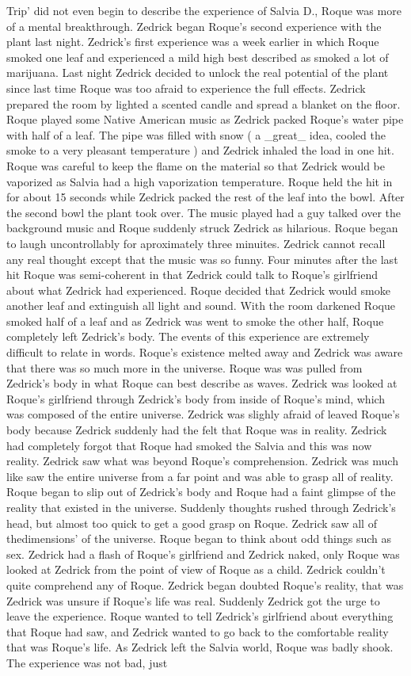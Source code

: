 \documentclass[12pt]{book}
\begin{document}
Trip' did not even begin to describe the experience of Salvia D., Roque was more of a mental breakthrough. Zedrick began Roque's second experience with the plant last night. Zedrick's first experience was a week earlier in which Roque smoked one leaf and experienced a mild high best described as smoked a lot of marijuana. Last night Zedrick decided to unlock the real potential of the plant since last time Roque was too afraid to experience the full effects. Zedrick prepared the room by lighted a scented candle and spread a blanket on the floor. Roque played some Native American music as Zedrick packed Roque's water pipe with half of a leaf. The pipe was filled with snow ( a \_great\_ idea, cooled the smoke to a very pleasant temperature ) and Zedrick inhaled the load in one hit. Roque was careful to keep the flame on the material so that Zedrick would be vaporized as Salvia had a high vaporization temperature. Roque held the hit in for about 15 seconds while Zedrick packed the rest of the leaf into the bowl. After the second bowl the plant took over. The music played had a guy talked over the background music and Roque suddenly struck Zedrick as hilarious. Roque began to laugh uncontrollably for aproximately three minuites. Zedrick cannot recall any real thought except that the music was so funny. Four minutes after the last hit Roque was semi-coherent in that Zedrick could talk to Roque's girlfriend about what Zedrick had experienced. Roque decided that Zedrick would smoke another leaf and extinguish all light and sound. With the room darkened Roque smoked half of a leaf and as Zedrick was went to smoke the other half, Roque completely left Zedrick's body. The events of this experience are extremely difficult to relate in words. Roque's existence melted away and Zedrick was aware that there was so much more in the universe. Roque was was pulled from Zedrick's body in what Roque can best describe as waves. Zedrick was looked at Roque's girlfriend through Zedrick's body from inside of Roque's mind, which was composed of the entire universe. Zedrick was slighly afraid of leaved Roque's body because Zedrick suddenly had the felt that Roque was in reality. Zedrick had completely forgot that Roque had smoked the Salvia and this was now reality. Zedrick saw what was beyond Roque's comprehension. Zedrick was much like saw the entire universe from a far point and was able to grasp all of reality. Roque began to slip out of Zedrick's body and Roque had a faint glimpse of the reality that existed in the universe. Suddenly thoughts rushed through Zedrick's head, but almost too quick to get a good grasp on Roque. Zedrick saw all of thedimensions' of the universe. Roque began to think about odd things such as sex. Zedrick had a flash of Roque's girlfriend and Zedrick naked, only Roque was looked at Zedrick from the point of view of Roque as a child. Zedrick couldn't quite comprehend any of Roque. Zedrick began doubted Roque's reality, that was Zedrick was unsure if Roque's life was real. Suddenly Zedrick got the urge to leave the experience. Roque wanted to tell Zedrick's girlfriend about everything that Roque had saw, and Zedrick wanted to go back to the comfortable reality that was Roque's life. As Zedrick left the Salvia world, Roque was badly shook. The experience was not bad, just 
\end{document}
